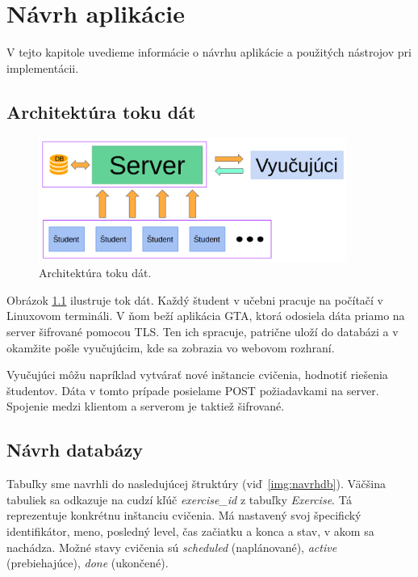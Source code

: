\chapter{Návrh aplikácie}
\label{kap:navrh}

V tejto kapitole uvedieme informácie o návrhu aplikácie a použitých nástrojov
pri implementácii.

\section{Architektúra toku dát}
\label{sec:architekturadata}

\begin{figure}[h]
	\centerline{\includegraphics[width=0.9\textwidth]{images/architekturadat.png}}
	\caption[Architektúra toku dát]{Architektúra toku dát.}
	\label{img:architekturadata}
\end{figure}

Obrázok \ref{img:architekturadata} ilustruje tok dát. Každý študent v učebni pracuje
na počítačí v Linuxovom termináli. V ňom beží aplikácia GTA, ktorá odosiela dáta
priamo na server šifrované pomocou TLS. Ten ich spracuje, patrične uloží do databázi
a v okamžite pošle vyučujúcim, kde sa zobrazia vo webovom rozhraní.

Vyučujúci môžu napríklad vytvárať nové inštancie cvičenia, hodnotiť riešenia študentov.
Dáta v tomto prípade posielame POST požiadavkami na server. Spojenie medzi klientom
a serverom je taktiež šifrované.

\section{Návrh databázy}
\label{sec:navrhdb}

Tabuľky sme navrhli do nasledujúcej štruktúry (viď~\ref{img:navrhdb}).
Väčšina tabuliek sa odkazuje na cudzí kľúč \textit{exercise\_id} z tabuľky
\textit{Exercise}. Tá reprezentuje konkrétnu inštanciu cvičenia. Má nastavený svoj
špecifický identifikátor, meno, posledný level, čas začiatku a konca a stav, v
akom sa nachádza. Možné stavy cvičenia sú \textit{scheduled} (naplánované),
\textit{active} (prebiehajúce), \textit{done} (ukončené).

